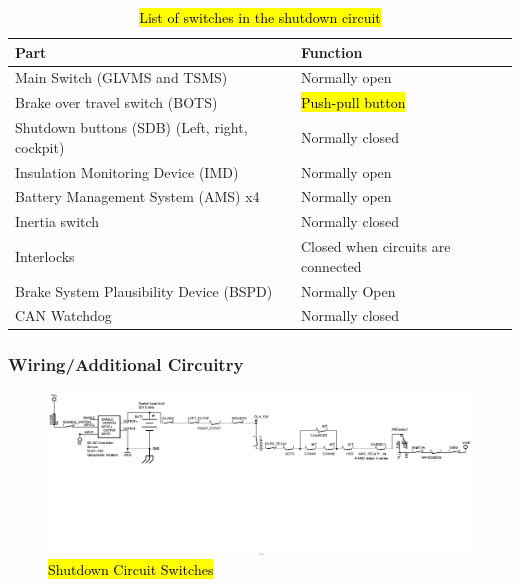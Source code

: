 \documentclass{article}
\DeclareRobustCommand{\hlr}[1]{{\sethlcolor{red}\hl{#1}}}
\begin{document}

            \begin{table}[H]
                \centering
                \begin{tabular}{|l|l|}
                \hline
                    Part & Function \\ \hline
                    Main Switch (GLVMS and TSMS) & Normally open \\ \hline
                    Brake over travel switch (BOTS) & \hlr{Push-pull button} \\ \hline
                    Shutdown buttons (SDB) (Left, right, cockpit) & Normally closed \\ \hline
                    Insulation Monitoring Device (IMD) & Normally open \\ \hline
                    Battery Management System  (AMS) x4 & Normally open \\ \hline
                    Inertia switch & Normally closed \\ \hline
                    Interlocks & Closed when circuits are connected \\ \hline
                    Brake System Plausibility Device (BSPD) & Normally Open \\ \hline
                    CAN Watchdog & Normally closed \\ \hline
                \end{tabular}
                \caption{\hlr{List of switches in the shutdown circuit}}
                \label{switchlist}
            \end{table}

        \subsubsection{Wiring/Additional Circuitry}


            \begin{figure}[H]
                \centering
                \includegraphics[width = 1 \textwidth]{shutdownswitches}
                \caption{\hlr{Shutdown Circuit Switches}}
                \label{switchesonly}
            \end{figure}
\end{document}
